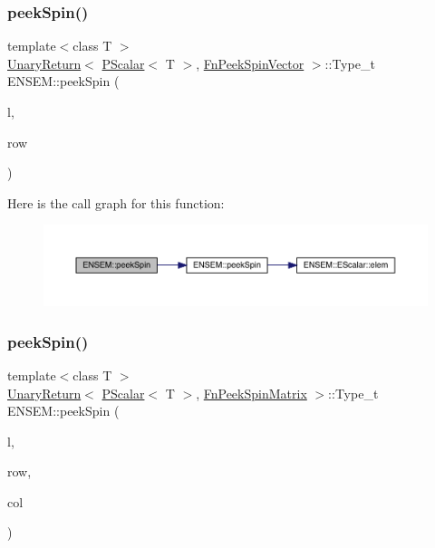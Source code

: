 \subsubsection{\texorpdfstring{peekSpin()}{peekSpin()}\hspace{0.1cm}{\footnotesize\ttfamily [1/2]}}
{\footnotesize\ttfamily template$<$class T $>$ \\
\mbox{\hyperlink{structENSEM_1_1UnaryReturn}{Unary\+Return}}$<$ \mbox{\hyperlink{classENSEM_1_1PScalar}{P\+Scalar}}$<$ T $>$, \mbox{\hyperlink{structENSEM_1_1FnPeekSpinVector}{Fn\+Peek\+Spin\+Vector}} $>$\+::Type\+\_\+t E\+N\+S\+E\+M\+::peek\+Spin (\begin{DoxyParamCaption}\item[{const \mbox{\hyperlink{classENSEM_1_1PScalar}{P\+Scalar}}$<$ T $>$ \&}]{l,  }\item[{int}]{row }\end{DoxyParamCaption})\hspace{0.3cm}{\ttfamily [inline]}}

Here is the call graph for this function\+:\nopagebreak
\begin{figure}[H]
\begin{center}
\leavevmode
\includegraphics[width=350pt]{db/dcc/group__primscalar_gae58d7282a3d7b7cb78a43c300314fd16_cgraph}
\end{center}
\end{figure}
\mbox{\label{group__primscalar_gae6a011ab6458165e95b6e647d6684b7b}} 
\subsubsection{\texorpdfstring{peekSpin()}{peekSpin()}\hspace{0.1cm}{\footnotesize\ttfamily [2/2]}}
{\footnotesize\ttfamily template$<$class T $>$ \\
\mbox{\hyperlink{structENSEM_1_1UnaryReturn}{Unary\+Return}}$<$ \mbox{\hyperlink{classENSEM_1_1PScalar}{P\+Scalar}}$<$ T $>$, \mbox{\hyperlink{structENSEM_1_1FnPeekSpinMatrix}{Fn\+Peek\+Spin\+Matrix}} $>$\+::Type\+\_\+t E\+N\+S\+E\+M\+::peek\+Spin (\begin{DoxyParamCaption}\item[{const \mbox{\hyperlink{classENSEM_1_1PScalar}{P\+Scalar}}$<$ T $>$ \&}]{l,  }\item[{int}]{row,  }\item[{int}]{col }\end{DoxyParamCaption})\hspace{0.3cm}{\ttfamily [inline]}}



